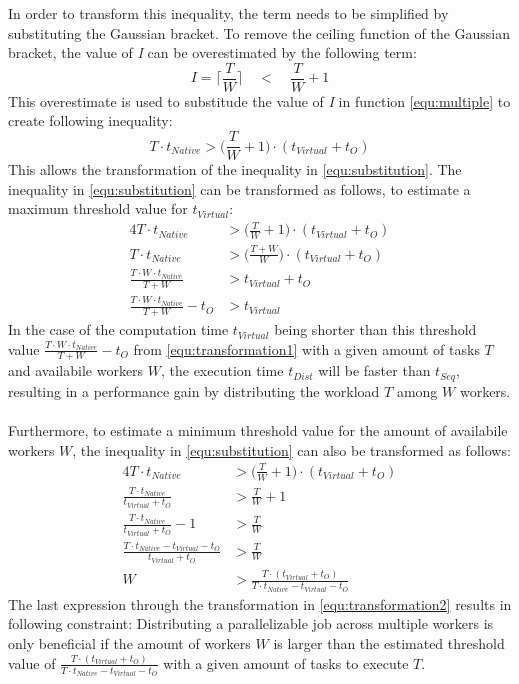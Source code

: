 In order to transform this inequality, the term needs to be simplified by substituting the Gaussian bracket. To remove the ceiling function of the Gaussian bracket, the value of \emph{I} can be overestimated by the following term:
\begin{equation}
  I = \bigg\lceil\frac{T}{W}\bigg\rceil \quad < \quad \frac{T}{W} + 1
  \label{equ:frac2}
\end{equation}
This overestimate is used to substitude the value of \emph{I} in function \eqref{equ:multiple} to create following inequality:
\begin{equation}
  T \cdot t_{Native} > \bigg(\frac{T}{W} + 1\bigg) \cdot (t_{Virtual} + t_{O})
  \label{equ:substitution}
\end{equation}
This allows the transformation of the inequality in \eqref{equ:substitution}. The inequality in \eqref{equ:substitution} can be transformed as follows, to estimate a maximum threshold value for $t_{Virtual}$:
\begin{alignat}{4}
  T \cdot t_{Native} &> \bigg(\frac{T}{W} + 1\bigg) \cdot (t_{Virtual} + t_{O}) \nonumber \\
  T \cdot t_{Native} &> \bigg(\frac{T + W}{W}\bigg) \cdot (t_{Virtual} + t_{O}) \nonumber \\
  \frac{T \cdot W \cdot t_{Native}}{T + W} &> t_{Virtual} + t_{O} \nonumber \\
  \frac{T \cdot W \cdot t_{Native}}{T + W} - t_{O} &> t_{Virtual}
  \label{equ:transformation1}
\end{alignat}
In the case of the computation time $t_{Virtual}$ being shorter than this threshold value $\frac{T \cdot W \cdot t_{Native}}{T + W} - t_{O}$ from \eqref{equ:transformation1} with a given amount of tasks $T$ and availabile workers $W$, the execution time $t_{Dist}$ will be faster than $t_{Seq}$, resulting in a performance gain by distributing the workload $T$ among $W$ workers.
~\\
Furthermore, to estimate a minimum threshold value for the amount of availabile workers $W$, the inequality in \eqref{equ:substitution} can also be transformed as follows:
\begin{alignat}{4}
  T \cdot t_{Native} &> \bigg(\frac{T}{W} + 1\bigg) \cdot (t_{Virtual} + t_{O}) \nonumber \\
  \frac{T \cdot t_{Native}}{t_{Virtual} + t_{O}} &> \frac{T}{W} + 1 \nonumber \\
  \frac{T \cdot t_{Native}}{t_{Virtual} + t_{O}} - 1 &> \frac{T}{W} \nonumber \\
  \frac{T \cdot t_{Native} - t_{Virtual} - t_{O}}{t_{Virtual} + t_{O}} &> \frac{T}{W} \nonumber \\
  W &> \frac{T \cdot (t_{Virtual} + t_{O})}{T \cdot t_{Native} - t_{Virtual} - t_{O}}
  \label{equ:transformation2}
\end{alignat}
The last expression through the transformation in \eqref{equ:transformation2} results in following constraint: Distributing a parallelizable job across multiple workers is only beneficial if the amount of workers $W$ is larger than the estimated threshold value of $\frac{T \cdot (t_{Virtual} + t_{O})}{T \cdot t_{Native} - t_{Virtual} - t_{O}}$ with a given amount of tasks to execute $T$.

